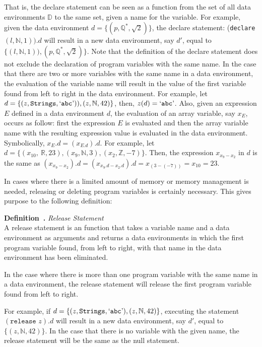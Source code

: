 \documentclass[11pt]{article}
\newcounter{definition}
\newenvironment{definition}[1][]{\stepcounter{definition}\par\medskip\noindent
\textbf{Definition~\thesection.\thedefinition #1} \rmfamily}{}
\newcounter{example}
\newcounter{case}
\newcounter{result}
\begin{document}
That is, the declare statement can be seen as a function from the set of all data environments $\mathbb{D}$ to the same set, given a name for the variable. For example, given the data environment $d=\{(p,\mathbb{Q^*},\sqrt{2})\}$, the declare statement: (\texttt{declare} $(l,\mathbb{N},1))$.$d$ will result in a new data environment, say $d'$, equal to  $\{(l,\mathbb{N},1)),(p,\mathbb{Q^*},\sqrt{2})\}$. Note that the definition of the declare statement does not exclude the declaration of program variables with the same name. In the case that there are two or more variables with the same name in a data environment, the evaluation of the variable name will result in the value of the first variable found from left to right in the data environment. For example, let $d=\{(z,\texttt{Strings}, `\texttt{abc}\textrm')),(z,\mathbb{N},42)\}$, then, $z(d)=`\texttt{abc}\textrm'$. Also, given an expression $E$ defined in a data environment $d$, the evaluation of an array variable, say $x_E$, occurs as follow: first the expression $E$ is evaluated and then the
array variable name with the resulting
expression value is evaluated in the data environment. Symbolically, $x_E.d=(x_{E.d}).d$. For example, let $d=\{(x_{10},\
\mathbb{R},23),(x_{9},\mathbb{N},3),(x_{2},\mathbb{Z},-7)\}$. Then, the expression $x_{x_9-x_2}$ in $d$ is the same as $(x_{x_9-x_2}).d=(x_{x_9.d-x_2.d}).d=x_{(3-(-7))}=x_{10}=23$.

In cases where there is a limited amount of memory or memory management is needed, releasing or deleting program variables is certainly necessary. This gives purpose to the following definition:

\begin{definition} \emph{Release Statement} \\
A release statement is an function that takes a variable name and a data environment as arguments and returns a data environments in which the first program variable found, from left to right, with that name in the data environment has been eliminated. \medskip
\end{definition}

In the case where there is more than one program variable with the same name in a data environment, the release statement will release the first program variable found from left to right.

For example, if $d=\{(z,\texttt{Strings}, `\texttt{abc}\textrm'),(z,\mathbb{N},42)\}$, executing the statement $(\texttt{release } z).d$ will result in a new data environment, say $d'$, equal to $\{(z,\mathbb{N},42)\}$. In the case that there is no variable with the given name, the release statement will be the same as the null statement.
\end{document}
